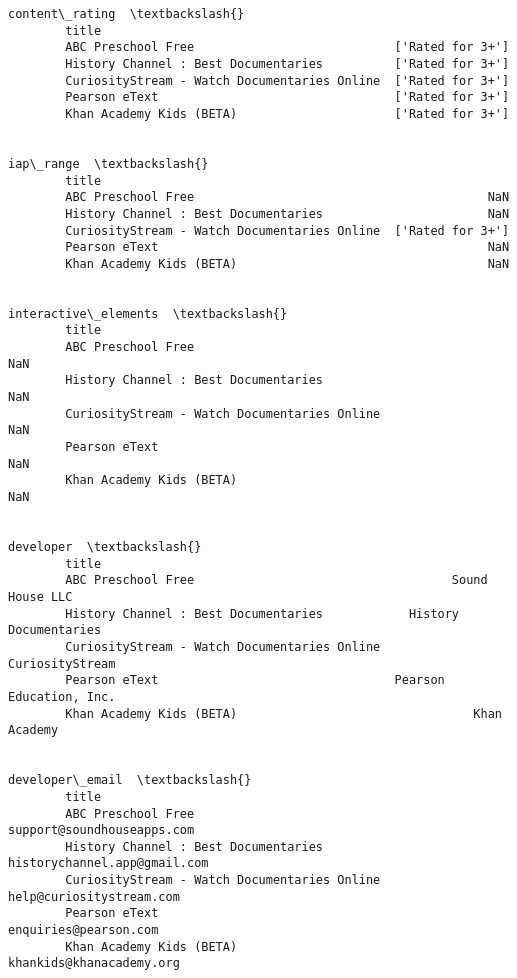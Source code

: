 \documentclass[11pt]{article}
\begin{document}
\begin{Verbatim}[commandchars=\\\{\}]
                                                        content\_rating  \textbackslash{}
        title                                                            
        ABC Preschool Free                            ['Rated for 3+']   
        History Channel : Best Documentaries          ['Rated for 3+']   
        CuriosityStream - Watch Documentaries Online  ['Rated for 3+']   
        Pearson eText                                 ['Rated for 3+']   
        Khan Academy Kids (BETA)                      ['Rated for 3+']   
        
                                                             iap\_range  \textbackslash{}
        title                                                            
        ABC Preschool Free                                         NaN   
        History Channel : Best Documentaries                       NaN   
        CuriosityStream - Watch Documentaries Online  ['Rated for 3+']   
        Pearson eText                                              NaN   
        Khan Academy Kids (BETA)                                   NaN   
        
                                                      interactive\_elements  \textbackslash{}
        title                                                                
        ABC Preschool Free                                             NaN   
        History Channel : Best Documentaries                           NaN   
        CuriosityStream - Watch Documentaries Online                   NaN   
        Pearson eText                                                  NaN   
        Khan Academy Kids (BETA)                                       NaN   
        
                                                                    developer  \textbackslash{}
        title                                                                   
        ABC Preschool Free                                    Sound House LLC   
        History Channel : Best Documentaries            History Documentaries   
        CuriosityStream - Watch Documentaries Online          CuriosityStream   
        Pearson eText                                 Pearson Education, Inc.   
        Khan Academy Kids (BETA)                                 Khan Academy   
        
                                                                   developer\_email  \textbackslash{}
        title                                                                        
        ABC Preschool Free                              support@soundhouseapps.com   
        History Channel : Best Documentaries          historychannel.app@gmail.com   
        CuriosityStream - Watch Documentaries Online      help@curiositystream.com   
        Pearson eText                                        enquiries@pearson.com   
        Khan Academy Kids (BETA)                          khankids@khanacademy.org   
        

\end{Verbatim}
\end{document}
